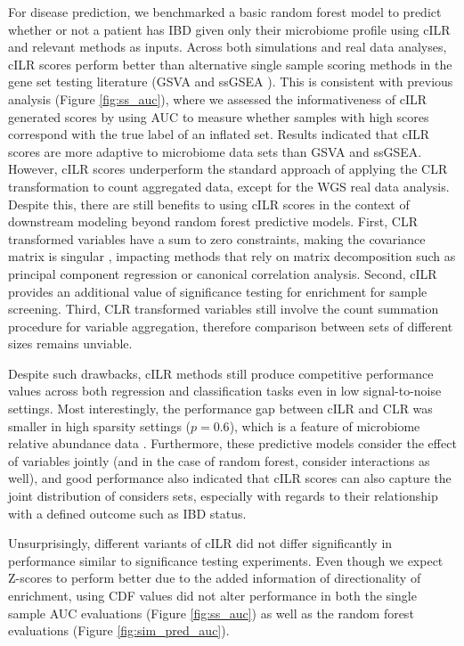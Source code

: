 \documentclass{article}
\begin{document}
For disease prediction, we benchmarked a basic random forest model \cite{breiman2001} to predict whether or not a patient has IBD given only their microbiome profile using cILR and relevant methods as inputs. Across both simulations and real data analyses, cILR scores perform better than alternative single sample scoring methods in the gene set testing literature (GSVA \cite{hanzelmann2013} and ssGSEA \cite{barbie2009}). This is consistent with previous analysis (Figure \ref{fig:ss_auc}), where we assessed the informativeness of cILR generated scores by using AUC to measure whether samples with high scores correspond with the true label of an inflated set. Results indicated that cILR scores are more adaptive to microbiome data sets than GSVA and ssGSEA. However, cILR scores underperform the standard approach of applying the CLR transformation to count aggregated data, except for the WGS real data analysis. Despite this, there are still benefits to using cILR scores in the context of downstream modeling beyond random forest predictive models. First, CLR transformed variables have a sum to zero constraints, making the covariance matrix is singular \cite{gloor2017}, impacting methods that rely on matrix decomposition such as principal component regression or canonical correlation analysis. Second, cILR provides an additional value of significance testing for enrichment for sample screening. Third, CLR transformed variables still involve the count summation procedure for variable aggregation, therefore comparison between sets of different sizes remains unviable.       

Despite such drawbacks, cILR methods still produce competitive performance values across both regression and classification tasks even in low signal-to-noise settings. Most interestingly, the performance gap between cILR and CLR was smaller in high sparsity settings ($p = 0.6$), which is a feature of microbiome relative abundance data \cite{li2019}. Furthermore, these predictive models consider the effect of variables jointly (and in the case of random forest, consider interactions as well), and good performance also indicated that cILR scores can also capture the joint distribution of considers sets, especially with regards to their relationship with a defined outcome such as IBD status.   

Unsurprisingly, different variants of cILR did not differ significantly in performance similar to significance testing experiments. Even though we expect Z-scores to perform better due to the added information of directionality of enrichment, using CDF values did not alter performance in both the single sample AUC evaluations (Figure \ref{fig:ss_auc}) as well as the random forest evaluations (Figure \ref{fig:sim_pred_auc}). 
\end{document}
